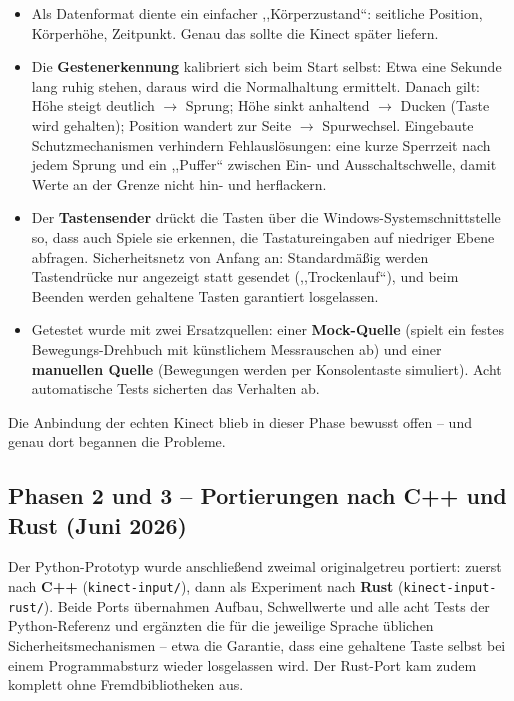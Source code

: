 \documentclass[12pt,a4paper]{article}
\newcommand{\code}[1]{\texttt{#1}}
\begin{document}
\begin{itemize}[leftmargin=*]
    \item Als Datenformat diente ein einfacher ,,Körperzustand``: seitliche Position, Körperhöhe, Zeitpunkt. Genau das sollte die Kinect später liefern.
    \item Die \textbf{Gestenerkennung} kalibriert sich beim Start selbst: Etwa eine Sekunde lang ruhig stehen, daraus wird die Normalhaltung ermittelt. Danach gilt: Höhe steigt deutlich $\rightarrow$ Sprung; Höhe sinkt anhaltend $\rightarrow$ Ducken (Taste wird gehalten); Position wandert zur Seite $\rightarrow$ Spurwechsel. Eingebaute Schutzmechanismen verhindern Fehlauslösungen: eine kurze Sperrzeit nach jedem Sprung und ein ,,Puffer`` zwischen Ein- und Ausschaltschwelle, damit Werte an der Grenze nicht hin- und herflackern.
    \item Der \textbf{Tastensender} drückt die Tasten über die Windows-Systemschnittstelle so, dass auch Spiele sie erkennen, die Tastatureingaben auf niedriger Ebene abfragen. Sicherheitsnetz von Anfang an: Standardmäßig werden Tastendrücke nur angezeigt statt gesendet (,,Trockenlauf``), und beim Beenden werden gehaltene Tasten garantiert losgelassen.
    \item Getestet wurde mit zwei Ersatzquellen: einer \textbf{Mock-Quelle} (spielt ein festes Bewegungs-Drehbuch mit künstlichem Messrauschen ab) und einer \textbf{manuellen Quelle} (Bewegungen werden per Konsolentaste simuliert). Acht automatische Tests sicherten das Verhalten ab.
\end{itemize}

Die Anbindung der echten Kinect blieb in dieser Phase bewusst offen -- und genau dort begannen die Probleme.

\subsection{Phasen 2 und 3 -- Portierungen nach C++ und Rust (Juni 2026)}

Der Python-Prototyp wurde anschließend zweimal originalgetreu portiert: zuerst nach \textbf{C++} (\code{kinect-input/}), dann als Experiment nach \textbf{Rust} (\code{kinect-input-rust/}). Beide Ports übernahmen Aufbau, Schwellwerte und alle acht Tests der Python-Referenz und ergänzten die für die jeweilige Sprache üblichen Sicherheitsmechanismen -- etwa die Garantie, dass eine gehaltene Taste selbst bei einem Programmabsturz wieder losgelassen wird. Der Rust-Port kam zudem komplett ohne Fremdbibliotheken aus.
\end{document}
